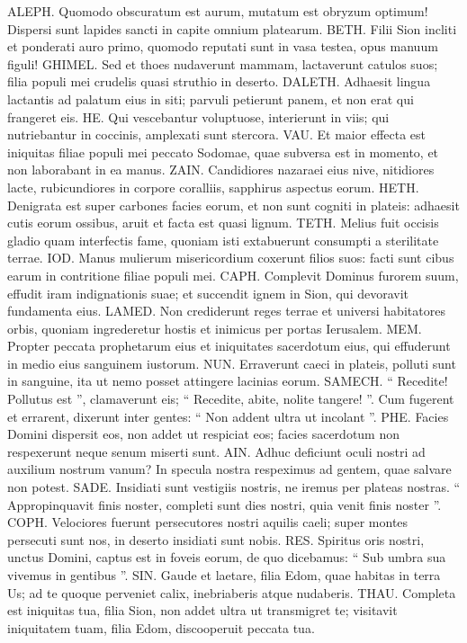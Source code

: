 \begin{biblechapter}
\begin{biblechapter}
\begin{biblechapter}
\begin{biblechapter}
 \verse ALEPH. Quomodo obscuratum est aurum,
 mutatum est obryzum optimum!
 Dispersi sunt lapides sancti
 in capite omnium platearum.
 \verse BETH. Filii Sion incliti
 et ponderati auro primo,
 quomodo reputati sunt in vasa testea,
 opus manuum figuli!
 \verse GHIMEL. Sed et thoes nudaverunt mammam,
 lactaverunt catulos suos;
 filia populi mei crudelis
 quasi struthio in deserto.
 \verse DALETH. Adhaesit lingua lactantis
 ad palatum eius in siti;
 parvuli petierunt panem,
 et non erat qui frangeret eis.
 \verse HE. Qui vescebantur voluptuose,
 interierunt in viis;
 qui nutriebantur in coccinis,
 amplexati sunt stercora.
 \verse VAU. Et maior effecta est iniquitas filiae populi mei
 peccato Sodomae,
 quae subversa est in momento,
 et non laborabant in ea manus.
 \verse ZAIN. Candidiores nazaraei eius nive,
 nitidiores lacte,
 rubicundiores in corpore coralliis,
 sapphirus aspectus eorum.
 \verse HETH. Denigrata est super carbones facies eorum,
 et non sunt cogniti in plateis:
 adhaesit cutis eorum ossibus,
 aruit et facta est quasi lignum.
 \verse TETH. Melius fuit occisis gladio
 quam interfectis fame,
 quoniam isti extabuerunt consumpti
 a sterilitate terrae.
 \verse IOD. Manus mulierum misericordium
 coxerunt filios suos:
 facti sunt cibus earum
 in contritione filiae populi mei.
 \verse CAPH. Complevit Dominus furorem suum,
 effudit iram indignationis suae;
 et succendit ignem in Sion,
 qui devoravit fundamenta eius.
 \verse LAMED. Non crediderunt reges terrae
 et universi habitatores orbis,
 quoniam ingrederetur hostis et inimicus
 per portas Ierusalem.
 \verse MEM. Propter peccata prophetarum eius
 et iniquitates sacerdotum eius,
 qui effuderunt in medio eius
 sanguinem iustorum.
 \verse NUN. Erraverunt caeci in plateis,
 polluti sunt in sanguine,
 ita ut nemo posset attingere
 lacinias eorum.
 \verse SAMECH. “ Recedite! Pollutus est ”, clamaverunt eis;
 “ Recedite, abite, nolite tangere! ”.
 Cum fugerent et errarent, dixerunt inter gentes:
 “ Non addent ultra ut incolant ”.
 \verse PHE. Facies Domini dispersit eos,
 non addet ut respiciat eos;
 facies sacerdotum non respexerunt
 neque senum miserti sunt.
 \verse AIN. Adhuc deficiunt oculi nostri
 ad auxilium nostrum vanum?
 In specula nostra respeximus
 ad gentem, quae salvare non potest.
 \verse SADE. Insidiati sunt vestigiis nostris,
 ne iremus per plateas nostras.
 “ Appropinquavit finis noster, completi sunt dies nostri,
 quia venit finis noster ”.
 \verse COPH. Velociores fuerunt persecutores nostri
 aquilis caeli;
 super montes persecuti sunt nos,
 in deserto insidiati sunt nobis.
 \verse RES. Spiritus oris nostri, unctus Domini,
 captus est in foveis eorum,
 de quo dicebamus: “ Sub umbra sua
 vivemus in gentibus ”.
 \verse SIN. Gaude et laetare, filia Edom,
 quae habitas in terra Us;
 ad te quoque perveniet calix,
 inebriaberis atque nudaberis.
 \verse THAU. Completa est iniquitas tua, filia Sion,
 non addet ultra ut transmigret te;
 visitavit iniquitatem tuam, filia Edom,
 discooperuit peccata tua.
 

\end{biblechapter}
\end{biblechapter}
\end{biblechapter}
\end{biblechapter}
